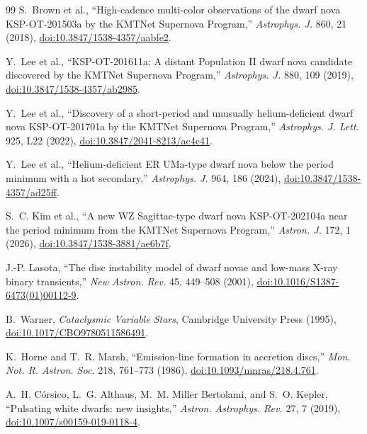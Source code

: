 \documentclass[10pt,onecolumn]{article}
\begin{document}
\begin{thebibliography}{99}
S.~Brown et al., ``High-cadence multi-color observations of the dwarf nova
KSP-OT-201503a by the KMTNet Supernova Program,'' \emph{Astrophys. J.} 860,
21 (2018),
\href{https://doi.org/10.3847/1538-4357/aabfe2}{doi:10.3847/1538-4357/aabfe2}.

Y.~Lee et al., ``KSP-OT-201611a: A distant Population II dwarf nova candidate
discovered by the KMTNet Supernova Program,'' \emph{Astrophys. J.} 880, 109
(2019),
\href{https://doi.org/10.3847/1538-4357/ab2985}{doi:10.3847/1538-4357/ab2985}.

Y.~Lee et al., ``Discovery of a short-period and unusually helium-deficient
dwarf nova KSP-OT-201701a by the KMTNet Supernova Program,''
\emph{Astrophys. J. Lett.} 925, L22 (2022),
\href{https://doi.org/10.3847/2041-8213/ac4c41}{doi:10.3847/2041-8213/ac4c41}.

Y.~Lee et al., ``Helium-deficient ER UMa-type dwarf nova below the period
minimum with a hot secondary,'' \emph{Astrophys. J.} 964, 186 (2024),
\href{https://doi.org/10.3847/1538-4357/ad25ff}{doi:10.3847/1538-4357/ad25ff}.

S.~C. Kim et al., ``A new WZ Sagittae-type dwarf nova KSP-OT-202104a near the
period minimum from the KMTNet Supernova Program,'' \emph{Astron. J.} 172, 1
(2026),
\href{https://doi.org/10.3847/1538-3881/ae6b7f}{doi:10.3847/1538-3881/ae6b7f}.

J.-P. Lasota, ``The disc instability model of dwarf novae and low-mass X-ray
binary transients,'' \emph{New Astron. Rev.} 45, 449--508 (2001),
\href{https://doi.org/10.1016/S1387-6473(01)00112-9}{doi:10.1016/S1387-6473(01)00112-9}.

B.~Warner, \emph{Cataclysmic Variable Stars}, Cambridge University Press
(1995), \href{https://doi.org/10.1017/CBO9780511586491}{doi:10.1017/CBO9780511586491}.

K.~Horne and T.~R. Marsh, ``Emission-line formation in accretion discs,''
\emph{Mon. Not. R. Astron. Soc.} 218, 761--773 (1986),
\href{https://doi.org/10.1093/mnras/218.4.761}{doi:10.1093/mnras/218.4.761}.

A.~H. Córsico, L.~G. Althaus, M.~M. Miller Bertolami, and S.~O. Kepler,
``Pulsating white dwarfs: new insights,'' \emph{Astron. Astrophys. Rev.} 27,
7 (2019),
\href{https://doi.org/10.1007/s00159-019-0118-4}{doi:10.1007/s00159-019-0118-4}.


\end{thebibliography}
\end{document}
